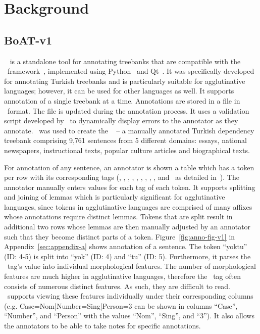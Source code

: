 \section{Background}
\label{sec:background}

\subsection{BoAT-v1}
\label{sec:boatvone}

\boatvone~\cite{turk-2021-boat} is a standalone tool for annotating treebanks that are compatible with the \ud\ framework~\cite{UD}, implemented using Python~\cite{python} and Qt~\cite{qt}.
It was specifically developed for annotating Turkish treebanks and is particularly suitable for agglutinative languages; however, it can be used for other languages as well.
It supports annotation of a single treebank at a time.
Annotations are stored in a file in \conllu\ format.
The file is updated during the annotation process.
It uses a validation script developed by \ud\ to dynamically display errors to the annotator as they annotate.
\boatvone\ was used to create the \bountreebank~\cite{ud-boun-treebank} -- a manually annotated Turkish dependency treebank comprising 9,761 sentences from 5 different domains: essays, national newspapers, instructional texts, popular culture articles and biographical texts.

For annotation of any sentence, an annotator is shown a table which has a token per row with its corresponding tags (\id, \form, \udlemma, \upos, \xpos, \feats, \head, \deprel, \deps, and \misc\ as detailed in~\cite{turk-2021-boat}).
The annotator manually enters values for each tag of each token.
It supports splitting and joining of lemmas which is particularly significant for agglutinative languages, since tokens in agglutinative languages are comprised of many affixes whose annotations require distinct lemmas.
Tokens that are split result in additional two rows whose lemmas are then manually adjusted by an annotator such that they become distinct parts of a token.
Figure~\ref{fig:anno-fig-v1} in Appendix~\ref{sec:appendix-a} shows annotation of a sentence.
The token ``yoktu'' (ID: 4-5) is split into ``yok'' (ID: 4) and ``tu'' (ID: 5). 
Furthermore, it parses the \feats\ tag's value into individual morphological features.
The number of morphological features are much higher in agglutinative languages, therefore the \feats\ tag often consists of numerous distinct features.
As such, they are difficult to read.
\boatvone\ supports viewing these features individually under their corresponding columns (e.g. Case=Nom|Number=Sing|Person=3 can be shown in columns ``Case'', ``Number'', and ``Person'' with the values ``Nom'', ``Sing'', and ``3'').
It also allows the annotators to be able to take notes for specific annotations.

